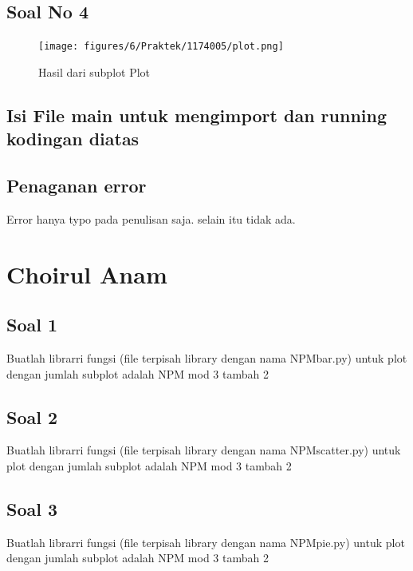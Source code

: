 \subsection{Soal No 4}



\begin{figure}[h]
\centering
\texttt{[image: figures/6/Praktek/1174005/plot.png]}
\caption{Hasil dari subplot Plot}
\label{fig:contoh}
\end{figure}

\subsection{Isi File main untuk mengimport dan running kodingan diatas}



\subsection{Penaganan error}
Error hanya typo pada penulisan saja. selain itu tidak ada.

\section{Choirul Anam}
\subsection{Soal 1}
Buatlah librarri fungsi (file terpisah library dengan nama NPMbar.py) untuk plot dengan jumlah subplot adalah NPM mod 3 tambah 2



\subsection{Soal 2}
Buatlah librarri fungsi (file terpisah library dengan nama NPMscatter.py) untuk plot dengan jumlah subplot adalah NPM mod 3 tambah  2



\subsection{Soal 3}
Buatlah librarri fungsi (file terpisah library dengan nama NPMpie.py) untuk plot dengan jumlah subplot adalah NPM mod 3 tambah 2

